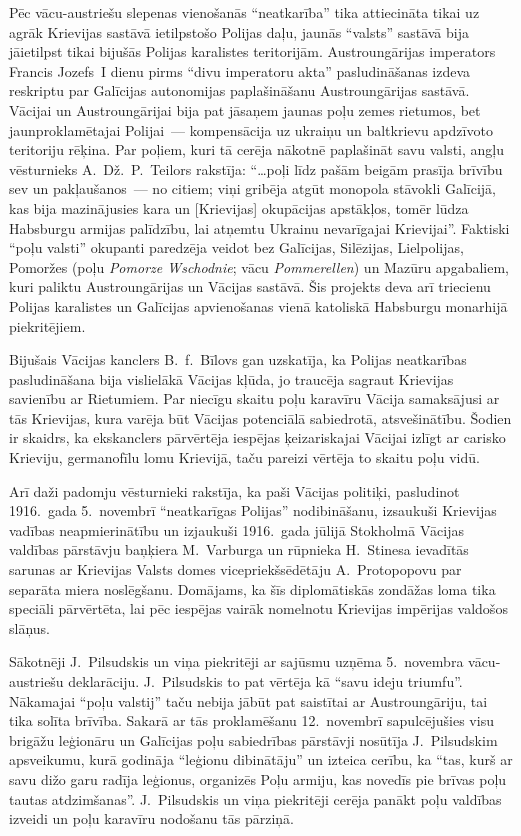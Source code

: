 \documentclass[twoside,a5paper,12pt,fleqn,openany]{extbook}
\newcommand{\pltxti}[1]{\textit{\textpolish{#1}}}
\newcommand{\detxti}[1]{\textit{\textgerman{#1}}}
\begin{document}
Pēc vācu-austriešu slepenas vienošanās ``neatkarība'' tika attiecināta tikai uz agrāk Krievijas sastāvā ietilpstošo Polijas daļu, jaunās ``valsts'' sastāvā bija jāietilpst tikai bijušās Polijas karalistes teritorijām. Austroungārijas imperators Francis Jozefs~I dienu pirms ``divu imperatoru akta'' pasludināšanas izdeva reskriptu par Galīcijas autonomijas paplašināšanu Austroungārijas sastāvā. Vācijai un Austroungārijai bija pat jāsaņem jaunas poļu zemes rietumos, bet jaunproklamētajai Polijai~--- kompensācija uz ukraiņu un baltkrievu apdzīvoto teritoriju rēķina. Par poļiem, kuri tā cerēja nākotnē paplašināt savu valsti, angļu vēsturnieks A.~Dž.~P.~Teilors rakstīja: ``\dots{}poļi līdz pašām beigām prasīja brīvību sev un pakļaušanos~--- no citiem; viņi gribēja atgūt monopola stāvokli Galīcijā, kas bija mazinājusies kara un [Krievijas] okupācijas apstākļos, tomēr lūdza Habsburgu armijas palīdzību, lai atņemtu Ukrainu nevarīgajai Krievijai''. Faktiski ``poļu valsti'' okupanti paredzēja veidot bez Galīcijas, Silēzijas, Lielpolijas, Pomoržes (poļu \pltxti{Pomorze Wschodnie}; vācu \detxti{Pommerellen}) un Mazūru apgabaliem, kuri paliktu Austroungārijas un Vācijas sastāvā. Šis projekts deva arī triecienu Polijas karalistes un Galīcijas apvienošanas vienā katoliskā Habsburgu monarhijā piekritējiem.

Bijušais Vācijas kanclers B.~f.~Bīlovs gan uzskatīja, ka Polijas neatkarības pasludināšana bija vislielākā Vācijas kļūda, jo traucēja sagraut Krievijas savienību ar Rietumiem. Par niecīgu skaitu poļu karavīru Vācija samaksājusi ar tās Krievijas, kura varēja būt Vācijas potenciālā sabiedrotā, atsvešinātību. Šodien ir skaidrs, ka ekskanclers pārvērtēja iespējas ķeizariskajai Vācijai izlīgt ar carisko Krieviju, germanofīlu lomu Krievijā, taču pareizi vērtēja to skaitu poļu vidū.

Arī daži padomju vēsturnieki rakstīja, ka paši Vācijas politiķi, pasludinot 1916.~gada 5.~novembrī ``neatkarīgas Polijas'' nodibināšanu, izsaukuši Krievijas vadības neapmierinātību un izjaukuši 1916.~gada jūlijā Stokholmā Vācijas valdības pārstāvju baņķiera M.~Varburga un rūpnieka H.~Stinesa ievadītās sarunas ar Krievijas Valsts domes vicepriekšsēdētāju A.~Protopopovu par separāta miera noslēgšanu. Domājams, ka šīs diplomātiskās zondāžas loma tika speciāli pārvērtēta, lai pēc iespējas vairāk nomelnotu Krievijas impērijas valdošos slāņus.

Sākotnēji J.~Pilsudskis un viņa piekritēji ar sajūsmu uzņēma 5.~novembra vācu-austriešu deklarāciju. J.~Pilsudskis to pat vērtēja kā ``savu ideju triumfu''. Nākamajai ``poļu valstij'' taču nebija jābūt pat saistītai ar Austroungāriju, tai tika solīta brīvība. Sakarā ar tās proklamēšanu 12.~novembrī sapulcējušies visu brigāžu leģionāru un Galīcijas poļu sabiedrības pārstāvji nosūtīja J.~Pilsudskim apsveikumu, kurā godināja ``leģionu dibinātāju'' un izteica cerību, ka ``tas, kurš ar savu dižo garu radīja leģionus, organizēs Poļu armiju, kas novedīs pie brīvas poļu tautas atdzimšanas''. J.~Pilsudskis un viņa piekritēji cerēja panākt poļu valdības izveidi un poļu karavīru nodošanu tās pārziņā.
\end{document}
